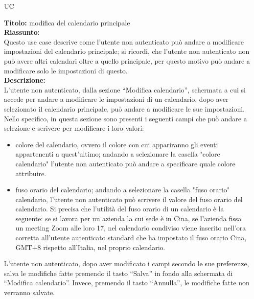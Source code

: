 \begin{listaPersonale}{UC}
    \begin{listaPersonale2}[UC] {}
            \textbf{Titolo: } modifica del calendario principale \\
            \textbf{Riassunto:} \\
            Questo use case descrive come l'utente non autenticato può andare a modificare impostazioni del calendario principale; si ricordi, che l'utente non autenticato non può avere altri calendari oltre a quello principale, per questo motivo può andare a modificare solo le impostazioni di questo. \\
            \textbf{Descrizione:} \\
            L'utente non autenticato, dalla sezione  “Modifica calendario”, schermata a cui si accede per andare a modificare le impostazioni di un calendario, dopo aver selezionato il calendario principale, può andare a modificare le sue impostazioni. Nello specifico, in questa sezione sono presenti i seguenti campi che può andare a selezione e scrivere per modificare i loro valori:
            \begin{itemize}
                \item colore del calendario, ovvero il colore con cui appariranno gli eventi appartenenti a quest'ultimo; andando a selezionare la casella "colore calendario" l'utente non autenticato può andare a specificare quale colore attribuire.
                \item fuso orario del calendario; andando a selezionare la casella "fuso orario" calendario, l'utente non autenticato può scrivere il valore del fuso orario del calendario. Si precisa che l'utilità del fuso orario di un calendario è la seguente:  se si lavora per un azienda la cui sede è in Cina, se l'azienda fissa un meeting Zoom alle loro 17, nel calendario condiviso viene inserito nell'ora corretta all'utente autenticato standard che ha impostato il fuso orario Cina, GMT+8 rispetto all'Italia, nel proprio calendario.
            \end{itemize}
            L'utente non autenticato, dopo aver modificato i campi secondo le sue preferenze, salva le modifiche fatte premendo il tasto “Salva” in fondo alla schermata di “Modifica calendario”. Invece, premendo il tasto “Annulla”, le modifiche fatte non verranno salvate.


\end{listaPersonale2}
\end{listaPersonale}
